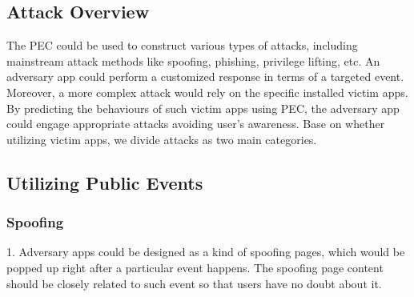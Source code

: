 \documentclass{sig-alternate-05-2015}
\begin{document}
%

\subsection{Attack Overview}
The PEC could be used to construct various types of attacks, including mainstream attack methods like spoofing, phishing, privilege lifting, etc. An adversary app could perform a customized response in terms of a targeted event. Moreover, a more complex attack would rely on the specific installed victim apps. By predicting the behaviours of such victim apps using PEC, the adversary app could engage appropriate attacks avoiding user's awareness.
Base on whether utilizing victim apps, we divide attacks as two main categories.

\subsection{Utilizing Public Events}
\subsubsection{Spoofing}
1. Adversary apps could be designed as a kind of spoofing pages, which would be popped up right after a particular event happens. The spoofing page content should be closely related to such event so that users have no doubt about it.
\end{document}
